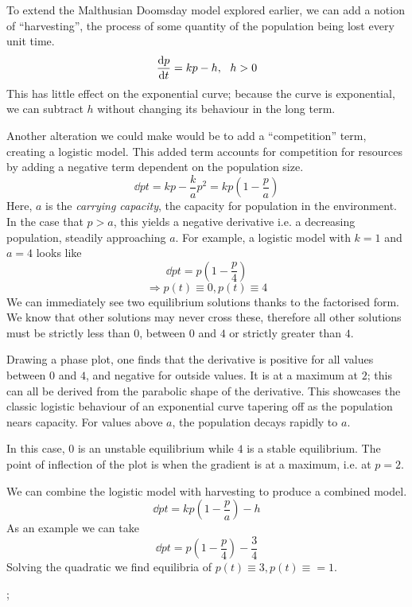 \documentclass[12pt]{report}
\begin{document}
\begin{flushleft}
To extend the Malthusian Doomsday model explored earlier, we can add a notion
of ``harvesting'', the process of some quantity of the population being lost
every unit time.
\[\frac{\mathrm{d}p}{\mathrm{d}t} = kp - h , \:\:\: h > 0\]
This has little effect on the exponential curve; because the curve is
exponential, we can subtract \(h\) without changing its behaviour in the long
term. \par
Another alteration we could make would be to add a ``competition'' term,
creating a logistic model. This added term accounts for competition for
resources by adding a negative term dependent on the population size.
\[\dd{p}{t} = kp - \frac{k}{a}p^2 = kp\left(1 - \frac{p}{a}\right)\]
Here, \(a\) is the \textit{carrying capacity}, the capacity for population in
the environment. In the case that \(p > a\), this yields a negative derivative
i.e. a decreasing population, steadily approaching \(a\). For example, a
logistic model with \(k = 1\) and \(a = 4\) looks like
\[\dd{p}{t} = p\left(1 - \frac{p}{4}\right)\]
\[\Rightarrow p(t) \equiv 0, p(t) \equiv 4\]
We can immediately see two equilibrium solutions thanks to the factorised form.
We know that other solutions may never cross these, therefore all other
solutions must be strictly less than \(0\), between \(0\) and \(4\) or strictly
greater than \(4\). \par
Drawing a phase plot, one finds that the derivative is positive for all values
between \(0\) and \(4\), and negative for outside values. It is at a maximum at
\(2\); this can all be derived from the parabolic shape of the derivative. This
showcases the classic logistic behaviour of an exponential curve tapering off
as the population nears capacity. For values above \(a\), the population decays
rapidly to \(a\). \par
In this case, \(0\) is an unstable equilibrium while \(4\) is a stable
equilibrium. The point of inflection of the plot is when the gradient is at a
maximum, i.e. at \(p = 2\). \par
We can combine the logistic model with harvesting to produce a combined model.
\[\dd{p}{t} = kp\left(1 - \frac{p}{a}\right) - h\]
As an example we can take
\[\dd{p}{t} = p\left(1 - \frac{p}{4}\right) - \frac{3}{4}\]
Solving the quadratic we find equilibria of \(p(t) \equiv 3, p(t) \equiv = 1\).

\begin{plot}[
    xmin = -0.5,
    xmax = 5,
    ymin = -1,
    ymax = 0.5,
    ylabel = \(\dd{p}{t}\),
    xlabel = \(p\)
]
    ;
\end{plot}


\end{flushleft}
\end{document}
